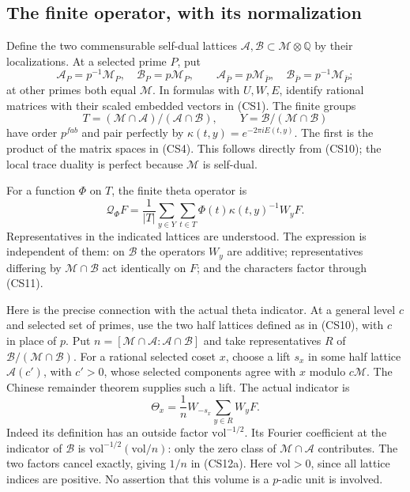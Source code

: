 \subsection{The finite operator, with its normalization}

Define the two commensurable self-dual lattices
$\mathcal A,\mathcal B\subset\mathcal M\otimes\mathbb Q$
by their localizations.  At a selected prime $P$, put
\[
 \mathcal A_P=p^{-1}\mathcal M_P,\quad
 \mathcal B_P=p\mathcal M_P,\qquad
 \mathcal A_{\bar P}=p\mathcal M_{\bar P},\quad
 \mathcal B_{\bar P}=p^{-1}\mathcal M_{\bar P};              \tag{CS10}
\]
at other primes both equal $\mathcal M$.
In formulas with $U,W,E$, identify rational matrices with
their scaled embedded vectors in (CS1).
The finite groups
\[
 T=(\mathcal M\cap\mathcal A)/(\mathcal A\cap\mathcal B),
 \qquad Y=\mathcal B/(\mathcal M\cap\mathcal B)             \tag{CS11}
\]
have order $p^{fab}$ and pair perfectly by
$\kappa(t,y)=e^{-2\pi iE(t,y)}$.
The first is the product of the matrix spaces in (CS4).
This follows directly from (CS10); the local trace duality
is perfect because $\mathcal M$ is self-dual.

For a function $\Phi$ on $T$, the finite theta operator is
\[
 \mathcal Q_\Phi F=
       \frac1{|T|}\sum_{y\in Y}\sum_{t\in T}
                  \Phi(t)\kappa(t,y)^{-1}W_yF.              \tag{CS12}
\]
Representatives in the indicated lattices are understood.
The expression is independent of them: on $\mathcal B$ the
operators $W_y$ are additive; representatives differing by
$\mathcal M\cap\mathcal B$ act identically on $F$; and
the characters factor through (CS11).

Here is the precise connection with the actual theta indicator.
At a general level $c$ and selected set of primes, use the
two half lattices defined as in (CS10), with $c$ in place
of $p$.  Put
$n=[\mathcal M\cap\mathcal A:\mathcal A\cap\mathcal B]$
and take representatives $R$ of
$\mathcal B/(\mathcal M\cap\mathcal B)$.
For a rational selected coset $x$, choose a lift $s_x$ in
some half lattice $\mathcal A(c')$, with $c'>0$, whose
selected components agree with $x$ modulo $c\mathcal M$.
The Chinese remainder theorem supplies such a lift.
The actual indicator is
\[
                  \Theta_x=\frac1n W_{-s_x}\sum_{y\in R}W_yF.
                                                               \tag{CS12a}
\]
Indeed its definition has an outside factor
$\mathrm{vol}^{-1/2}$.  Its Fourier coefficient at the
indicator of $\mathcal B$ is
$\mathrm{vol}^{-1/2}(\mathrm{vol}/n)$: only the zero
class of $\mathcal M\cap\mathcal A$ contributes.  The
two factors cancel exactly, giving $1/n$ in (CS12a).
Here $\mathrm{vol}>0$, since all lattice indices are
positive.  No assertion that this volume is a $p$-adic
unit is involved.

